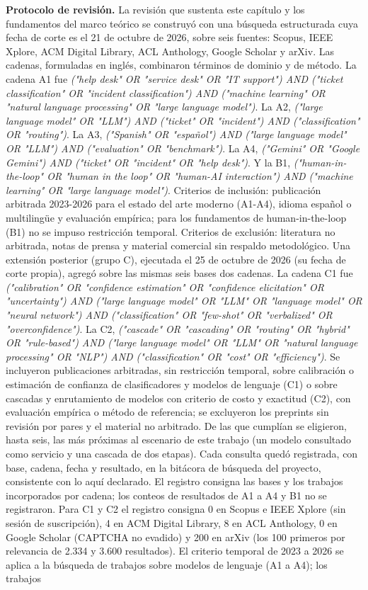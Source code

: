 \noindent\textbf{Protocolo de revisión.} La revisión que sustenta este capítulo y los fundamentos del marco teórico se construyó con una búsqueda estructurada cuya fecha de corte es el 21 de octubre de 2026, sobre seis fuentes: Scopus, IEEE Xplore, ACM Digital Library, ACL Anthology, Google Scholar y arXiv. Las cadenas, formuladas en inglés, combinaron términos de dominio y de método. La cadena A1 fue {\emph{("help desk" OR "service desk" OR "IT support") AND ("ticket classification" OR "incident classification") AND ("machine learning" OR "natural language processing" OR "large language model")}}. La A2, {\emph{("large language model" OR "LLM") AND ("ticket" OR "incident") AND ("classification" OR "routing")}}. La A3, {\emph{("Spanish" OR "español") AND ("large language model" OR "LLM") AND ("evaluation" OR "benchmark")}}. La A4, {\emph{("Gemini" OR "Google Gemini") AND ("ticket" OR "incident" OR "help desk")}}. Y la B1, {\emph{("human-in-the-loop" OR "human in the loop" OR "human-AI interaction") AND ("machine learning" OR "large language model")}}. Criterios de inclusión: publicación arbitrada 2023-2026 para el estado del arte moderno (A1-A4), idioma español o multilingüe y evaluación empírica; para los fundamentos de human-in-the-loop (B1) no se impuso restricción temporal. Criterios de exclusión: literatura no arbitrada, notas de prensa y material comercial sin respaldo metodológico. Una extensión posterior (grupo C), ejecutada el 25 de octubre de 2026 (su fecha de corte propia), agregó sobre las mismas seis bases dos cadenas. La cadena C1 fue {\emph{("calibration" OR "confidence estimation" OR "confidence elicitation" OR "uncertainty") AND ("large language model" OR "LLM" OR "language model" OR "neural network") AND ("classification" OR "few-shot" OR "verbalized" OR "overconfidence")}}. La C2, {\emph{("cascade" OR "cascading" OR "routing" OR "hybrid" OR "rule-based") AND ("large language model" OR "LLM" OR "natural language processing" OR "NLP") AND ("classification" OR "cost" OR "efficiency")}}. Se incluyeron publicaciones arbitradas, sin restricción temporal, sobre calibración o estimación de confianza de clasificadores y modelos de lenguaje (C1) o sobre cascadas y enrutamiento de modelos con criterio de costo y exactitud (C2), con evaluación empírica o método de referencia; se excluyeron los preprints sin revisión por pares y el material no arbitrado. De las que cumplían se eligieron, hasta seis, las más próximas al escenario de este trabajo (un modelo consultado como servicio y una cascada de dos etapas). Cada consulta quedó registrada, con base, cadena, fecha y resultado, en la bitácora de búsqueda del proyecto, consistente con lo aquí declarado. El registro consigna las bases y los trabajos incorporados por cadena; los conteos de resultados de A1 a A4 y B1 no se registraron. Para C1 y C2 el registro consigna 0 en Scopus e IEEE Xplore (sin sesión de suscripción), 4 en ACM Digital Library, 8 en ACL Anthology, 0 en Google Scholar (CAPTCHA no evadido) y 200 en arXiv (los 100 primeros por relevancia de 2.334 y 3.600 resultados). El criterio temporal de 2023 a 2026 se aplica a la búsqueda de trabajos sobre modelos de lenguaje (A1 a A4); los trabajos 